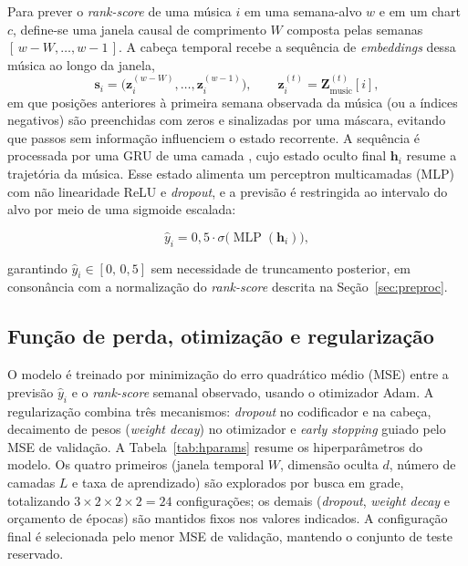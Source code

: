 Para prever o \emph{rank-score} de uma música $i$ em uma semana-alvo $w$ e em um chart $c$, define-se uma janela causal de comprimento $W$ composta pelas semanas $[\,w-W, \dots, w-1\,]$. A cabeça temporal recebe a sequência de \emph{embeddings} dessa música ao longo da janela,
\begin{equation}
\label{eq:seq}
\mathbf{s}_i = \big( \mathbf{z}_i^{(w-W)}, \dots, \mathbf{z}_i^{(w-1)} \big), \qquad \mathbf{z}_i^{(t)} = \mathbf{Z}^{(t)}_{\text{music}}[i],
\end{equation}
\noindent em que posições anteriores à primeira semana observada da música (ou a índices negativos) são preenchidas com zeros e sinalizadas por uma máscara, evitando que passos sem informação influenciem o estado recorrente. A sequência é processada por uma GRU de uma camada \citep{cho2014gru}, cujo estado oculto final $\mathbf{h}_i$ resume a trajetória da música. Esse estado alimenta um perceptron multicamadas (MLP) com não linearidade ReLU e \emph{dropout}, e a previsão é restringida ao intervalo do alvo por meio de uma sigmoide escalada:

\begin{equation}
\label{eq:head-out}
\hat{y}_i = 0{,}5 \cdot \sigma\big( \operatorname{MLP}(\mathbf{h}_i) \big),
\end{equation}

\noindent garantindo $\hat{y}_i \in [0,\,0{,}5]$ sem necessidade de truncamento posterior, em consonância com a normalização do \emph{rank-score} descrita na Seção~\ref{sec:preproc}.

\subsection{Função de perda, otimização e regularização}

O modelo é treinado por minimização do erro quadrático médio (MSE) entre a previsão $\hat{y}_i$ e o \emph{rank-score} semanal observado, usando o otimizador Adam. A regularização combina três mecanismos: \emph{dropout} no codificador e na cabeça, decaimento de pesos (\emph{weight decay}) no otimizador e \emph{early stopping} guiado pelo MSE de validação. A Tabela~\ref{tab:hparams} resume os hiperparâmetros do modelo. Os quatro primeiros (janela temporal $W$, dimensão oculta $d$, número de camadas $L$ e taxa de aprendizado) são explorados por busca em grade, totalizando $3 \times 2 \times 2 \times 2 = 24$ configurações; os demais (\emph{dropout}, \emph{weight decay} e orçamento de épocas) são mantidos fixos nos valores indicados. A configuração final é selecionada pelo menor MSE de validação, mantendo o conjunto de teste reservado.

